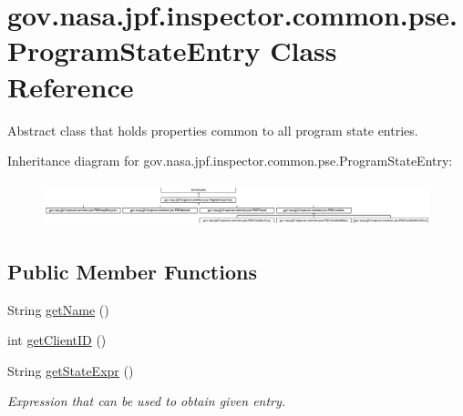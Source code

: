 \hypertarget{classgov_1_1nasa_1_1jpf_1_1inspector_1_1common_1_1pse_1_1_program_state_entry}{}\section{gov.\+nasa.\+jpf.\+inspector.\+common.\+pse.\+Program\+State\+Entry Class Reference}
\label{classgov_1_1nasa_1_1jpf_1_1inspector_1_1common_1_1pse_1_1_program_state_entry}


Abstract class that holds properties common to all program state entries.  


Inheritance diagram for gov.\+nasa.\+jpf.\+inspector.\+common.\+pse.\+Program\+State\+Entry\+:\begin{figure}[H]
\begin{center}
\leavevmode
\includegraphics[height=1.302326cm]{classgov_1_1nasa_1_1jpf_1_1inspector_1_1common_1_1pse_1_1_program_state_entry}
\end{center}
\end{figure}
\subsection*{Public Member Functions}
\begin{DoxyCompactItemize}
\item 
String \hyperlink{classgov_1_1nasa_1_1jpf_1_1inspector_1_1common_1_1pse_1_1_program_state_entry_ac96b4ceba0c8c9c674b0cca509b63a3b}{get\+Name} ()
\item 
int \hyperlink{classgov_1_1nasa_1_1jpf_1_1inspector_1_1common_1_1pse_1_1_program_state_entry_a5f1b62c50f124c1bd01be0111706a1f5}{get\+Client\+ID} ()
\item 
String \hyperlink{classgov_1_1nasa_1_1jpf_1_1inspector_1_1common_1_1pse_1_1_program_state_entry_a9d819571ca1cc982a7d31df70548fd96}{get\+State\+Expr} ()
\begin{DoxyCompactList}\small\item\em Expression that can be used to obtain given entry. \end{DoxyCompactList}\end{DoxyCompactItemize}
